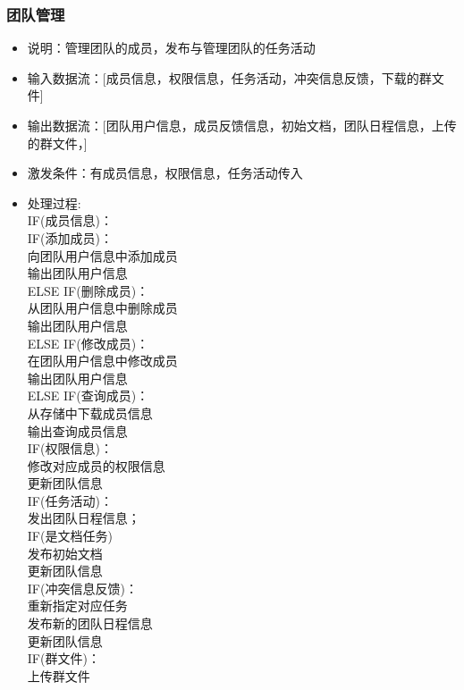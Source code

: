             \subsubsection{团队管理}
            \begin{itemize}
                \item 说明：管理团队的成员，发布与管理团队的任务活动
                \item 输入数据流：[成员信息，权限信息，任务活动，冲突信息反馈，下载的群文件]
                \item 输出数据流：[团队用户信息，成员反馈信息，初始文档，团队日程信息，上传的群文件，]
                \item 激发条件：有成员信息，权限信息，任务活动传入
                \item 处理过程:   \\
                IF(成员信息)：\\
                    IF(添加成员)：\\
                        向团队用户信息中添加成员\\
                        输出团队用户信息\\
                    ELSE IF(删除成员)：\\
                        从团队用户信息中删除成员\\
                        输出团队用户信息\\
                    ELSE IF(修改成员)：\\
                        在团队用户信息中修改成员\\
                        输出团队用户信息\\
                    ELSE IF(查询成员)：\\
                        从存储中下载成员信息\\
                        输出查询成员信息\\
                IF(权限信息)：\\
                    修改对应成员的权限信息\\
                    更新团队信息\\
                IF(任务活动)：\\
                    发出团队日程信息；\\
                    IF(是文档任务)\\
                        发布初始文档\\
                    更新团队信息\\
                IF(冲突信息反馈)：\\
                    重新指定对应任务\\
                    发布新的团队日程信息\\
                    更新团队信息    \\
                IF(群文件)：\\
                    上传群文件\\
                    
            \end{itemize}
